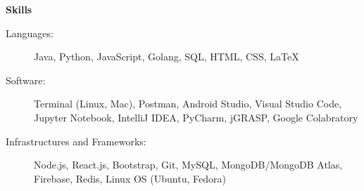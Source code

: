 \documentclass[letterpaper,10pt]{article}
\newcommand{\resitem}[1]{\item #1 \vspace{-2pt}}
\newcommand{\resheading}[1]{{\large \colorbox{mygrey}{\begin{minipage}{\textwidth}{\textbf{#1 \vphantom{p\^{E}}}}\end{minipage}}}}
\begin{document}
\begin{itemize}
\begin{itemize}
	\end{itemize}
	
\end{itemize}

\resheading{Skills}

\begin{description}
\item[Languages:] Java, Python, JavaScript, Golang, SQL, HTML, CSS, LaTeX %
\item[Software:] Terminal (Linux, Mac), Postman, Android Studio, Visual Studio Code, Jupyter Notebook, IntelliJ IDEA, PyCharm, jGRASP, Google Colabratory
\item[Infrastructures and Frameworks:] Node.js, React.js, Bootstrap, Git, MySQL, MongoDB/MongoDB Atlas, Firebase, Redis, Linux OS (Ubuntu, Fedora)
\end{description}
\end{document}
